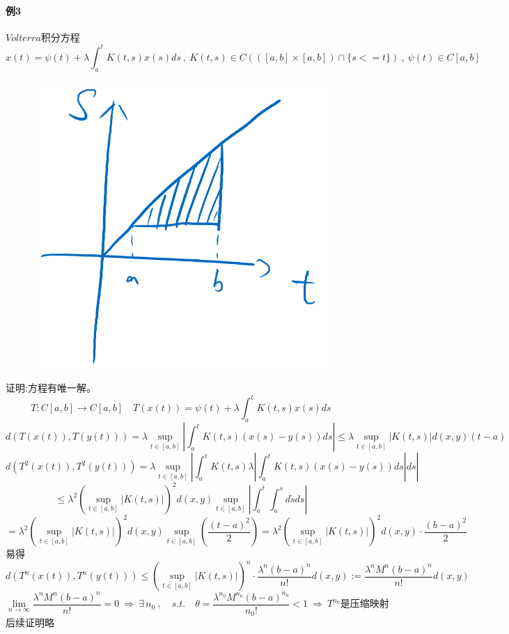 \paragraph*{例3} \quad $Volterra$积分方程
\[x(t)=\psi(t)+\lambda\int_a^tK(t,s)x(s)ds \ , \ K(t,s) \in C(([a,b] \times [a,b])\cap\{s<=t\}) \ , \ \psi(t) \in C[a,b]\]
\begin{figure}[htbp]
    \center
    \includegraphics[scale=0.25]{./fig/2.1.5-1.png}
\end{figure}
证明:方程有唯一解。\\
\[T:C[a,b] \to C[a,b] \quad T(x(t))=\psi(t)+\lambda\int_a^tK(t,s)x(s)ds\]
\[d(T(x(t)),T(y(t)))=\lambda\mathop {\text{sup}}\limits_{t \in [a,b]}\left|\int_a^tK(t,s)(x(s)-y(s))ds\right| \leq \lambda\mathop {\text{sup}}\limits_{t \in [a,b]}\left|K(t,s)\right|d(x,y)(t-a)\]
\[d(T^2(x(t)),T^2(y(t)))=\lambda\mathop {\text{sup}}\limits_{t \in [a,b]}\left|\int_a^tK(t,s)\lambda\left|\int_a^tK(t,s)(x(s)-y(s))ds\right|ds\right|\]
\[\leq \lambda^2\left(\mathop {\text{sup}}\limits_{t \in [a,b]}\left|K(t,s)\right|\right)^2d(x,y)\mathop {\text{sup}}\limits_{t \in [a,b]}\left|\int_a^t\int_a^sd\tilde{s}ds\right|\]
\[=\lambda^2\left(\mathop {\text{sup}}\limits_{t \in [a,b]}\left|K(t,s)\right|\right)^2d(x,y)\mathop {\text{sup}}\limits_{t \in [a,b]}\left(\frac{(t-a)^2}{2}\right)=\lambda^2\left(\mathop {\text{sup}}\limits_{t \in [a,b]}\left|K(t,s)\right|\right)^2d(x,y) \cdot \frac{(b-a)^2}{2}\]
易得
\[d(T^n(x(t)),T^n(y(t))) \leq \left(\mathop {\text{sup}}\limits_{t \in [a,b]}\left|K(t,s)\right|\right)^n \cdot \frac{\lambda^n(b-a)^n}{n!}d(x,y):=\frac{\lambda^nM^n(b-a)^n}{n!}d(x,y)\]
\[\lim_{n \to \infty}\frac{\lambda^nM^n(b-a)^n}{n!}=0 \ \Rightarrow \ \exists \, n_0 \ , \quad s.t. \quad \theta=\frac{\lambda^{n_0}M^{n_0}(b-a)^{n_0}}{{n_0}!}<1 \ \Rightarrow \ T^{n_0}\text{是压缩映射}\]
后续证明略
